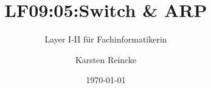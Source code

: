 \documentclass[]{beamer}
\title{LF09:05:Switch \& ARP }
\subtitle{Layer I-II für Fachinformatikerin}
\institute[GS-LDK]{Gewerbliche Schulen Dillenburg}
\author{Karsten Reincke}
\date{\today}
\def\cfgGl{../../../cfg.gl/}
\begin{document}

\begin{frame}
  \titlepage

  
\end{frame}






\logo{}
\newpage



%
\end{document}
